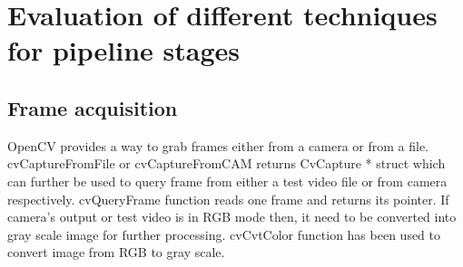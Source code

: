 \section {Evaluation of different techniques for pipeline stages}
\subsection{Frame acquisition}
\indent OpenCV provides a way to grab frames either from a camera or
from a file. cvCaptureFromFile or cvCaptureFromCAM returns CvCapture *
struct which can further be used to query frame from either a test video
file or from camera respectively. cvQueryFrame function reads one frame
and returns its pointer. If camera's output or test video is in RGB mode
then, it need to be converted into gray scale image for further
processing. cvCvtColor function has been used to convert image from RGB
to gray scale.
